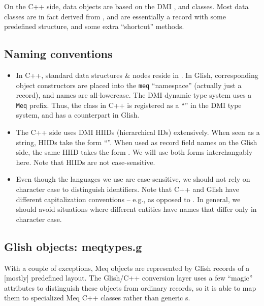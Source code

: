 \documentclass[10pt]{article}
\begin{document}
  On the C++ side, data objects are based on the DMI ,
   and  classes. Most data classes are in fact
  derived from , and are essentially a record with some
  predefined structure, and some extra ``shortcut'' methods. 

\subsection{Naming conventions}

  \begin{itemize}

  \item In C++, standard data structures \& nodes reside in .
    In Glish, corresponding object constructors are placed into the {\tt meq}
    ``namespace'' (actually just a record), and names are all-lowercase. The
    DMI dynamic type system uses a {\tt Meq} prefix. Thus, the
     class in C++ is registered as a ``'' in
    the DMI type system, and  has a   counterpart in Glish.

  \item The C++ side uses DMI HIIDs (hierarchical IDs) extensively. When seen
    as a string, HIIDs take the form ``''. When used as record
    field names on the Glish side, the same HIID takes the form
    . We will use both forms interchangably here. Note that
    HIIDs are not case-sensitive.
    
  \item Even though the languages we use are case-sensitive, we should not rely
    on character case to distinguish identifiers. Note that C++ and Glish have
    different capitalization conventions -- e.g.,  as opposed
    to . In general, we should avoid situations where different
    entities have names that differ only in character case.

  \end{itemize}

\subsection{Glish  objects: meqtypes.g}

  With a couple of exceptions, Meq objects are represented by Glish records of
  a [mostly] predefined layout. The Glish/C++ conversion layer uses a few
  ``magic'' attributes to distinguish these objects from ordinary records, so
  it is able to map them to specialized Meq C++ classes rather than generic
  s. 
\end{document}

